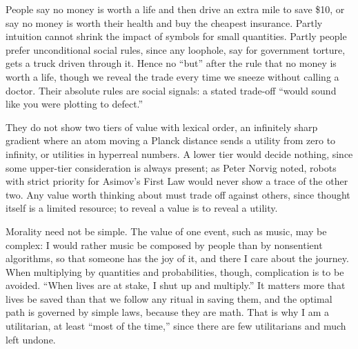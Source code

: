 People say no money is worth a life and then drive an extra mile to save \$10, or say no money is worth their health and buy the cheapest insurance. Partly intuition cannot shrink the impact of symbols for small quantities. Partly people prefer unconditional social rules, since any loophole, say for government torture, gets a truck driven through it. Hence no ``but'' after the rule that no money is worth a life, though we reveal the trade every time we sneeze without calling a doctor. Their absolute rules are social signals: a stated trade-off ``would sound like you were plotting to defect.''

They do not show two tiers of value with lexical order, an infinitely sharp gradient where an atom moving a Planck distance sends a utility from zero to infinity, or utilities in hyperreal numbers. A lower tier would decide nothing, since some upper-tier consideration is always present; as Peter Norvig noted, robots with strict priority for Asimov's First Law would never show a trace of the other two. Any value worth thinking about must trade off against others, since thought itself is a limited resource; to reveal a value is to reveal a utility. 

Morality need not be simple. The value of one event, such as music, may be complex: I would rather music be composed by people than by nonsentient algorithms, so that someone has the joy of it, and there I care about the journey. When multiplying by quantities and probabilities, though, complication is to be avoided. ``When lives are at stake, I shut up and multiply.'' It matters more that lives be saved than that we follow any ritual in saving them, and the optimal path is governed by simple laws, because they are math. That is why I am a utilitarian, at least ``most of the time,'' since there are few utilitarians and much left undone.
